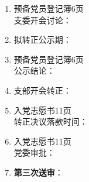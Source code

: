 \documentclass[fontset=windows]{ctexart}
\begin{document}
\begin{tcolorbox}
\begin{multicols}{2}
\begin{enumerate}
            \item 预备党员登记簿6页\\支委开会讨论：
            \item 拟转正公示期：
            \item 预备党员登记簿6页\\公示结论：
            \item 支部开会转正：
            \item 入党志愿书11页\\转正决议落款时间：
            \item 入党志愿书11页\\党委审批：
            \item \textbf{第三次送审}：
        \end{enumerate}
    \end{multicols}
\end{tcolorbox}
\end{document}
